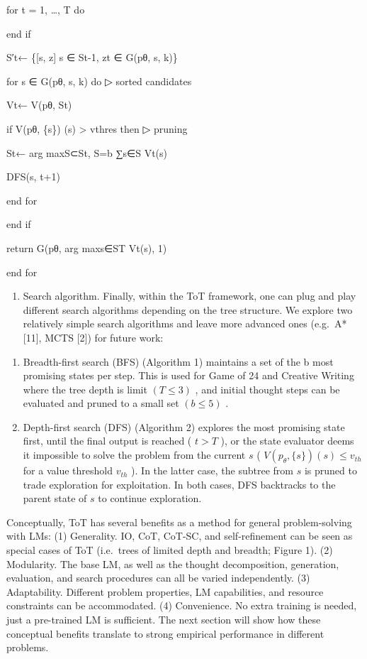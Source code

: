 \documentclass[
]{article}
\providecommand{\tightlist}{%
  \setlength{\itemsep}{0pt}\setlength{\parskip}{0pt}}
\begin{document}
for t = 1, \ldots, T do

end if

S′t← \{{[}s, z{]} \textbar{} s ∈ St-1, zt ∈ G(pθ, s, k)\}

for s\textquotesingle{} ∈ G(pθ, s, k) do ▷ sorted candidates

Vt← V(pθ, St\textquotesingle)

if V(pθ, \{s\textquotesingle\}) (s) \textgreater{} vthres then ▷ pruning

St← arg maxS⊂St, \textbar S\textbar=b ∑s∈S Vt(s)

DFS(s\textquotesingle, t+1)

end for

end if

return G(pθ, arg maxs∈ST Vt(s), 1)

end for

\begin{enumerate}
\def\labelenumi{\arabic{enumi}.}
\setcounter{enumi}{3}
\tightlist
\item
  Search algorithm. Finally, within the ToT framework, one can plug and
  play different search algorithms depending on the tree structure. We
  explore two relatively simple search algorithms and leave more
  advanced ones (e.g.~A* {[}11{]}, MCTS {[}2{]}) for future work:
\end{enumerate}

\begin{enumerate}
\def\labelenumi{(\alph{enumi})}
\tightlist
\item
  Breadth-first search (BFS) (Algorithm 1) maintains a set of the b most
  promising states per step. This is used for Game of 24 and Creative
  Writing where the tree depth is limit \((T \leq 3)\) , and initial
  thought steps can be evaluated and pruned to a small set
  \((b \leq 5)\) .\\
\item
  Depth-first search (DFS) (Algorithm 2) explores the most promising
  state first, until the final output is reached ( \(t > T\) ), or the
  state evaluator deems it impossible to solve the problem from the
  current \(s\) ( \(V(p_{\theta}, \{s\})(s) \leq v_{th}\) for a value
  threshold \(v_{th}\) ). In the latter case, the subtree from \(s\) is
  pruned to trade exploration for exploitation. In both cases, DFS
  backtracks to the parent state of \(s\) to continue exploration.
\end{enumerate}

Conceptually, ToT has several benefits as a method for general
problem-solving with LMs: (1) Generality. IO, CoT, CoT-SC, and
self-refinement can be seen as special cases of ToT (i.e.~trees of
limited depth and breadth; Figure 1). (2) Modularity. The base LM, as
well as the thought decomposition, generation, evaluation, and search
procedures can all be varied independently. (3) Adaptability. Different
problem properties, LM capabilities, and resource constraints can be
accommodated. (4) Convenience. No extra training is needed, just a
pre-trained LM is sufficient. The next section will show how these
conceptual benefits translate to strong empirical performance in
different problems.
\end{document}
